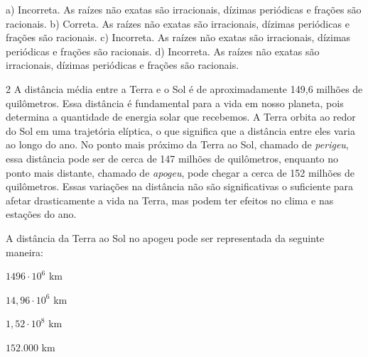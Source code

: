 \begin{escolha}
\begin{escolha}
\begin{escolha}
\begin{escolha}
{\begin{boxmedio}
\begin{boxpeq}
\begin{q°}
\begin{boxmedio}
\begin{boxpeq}
\begin{boxpeq}
\begin{boxmedio}
\begin{boxmedio}
\begin{boxmedio}
\begin{largebox}
\begin{boxmedio}
{\begin{enumerate}
\begin{boxpeq}
{\begin{boxpeq}
\begin{boxpeq}
\begin{boxmedio}
\begin{boxpeq}
\begin{boxpeq}
\begin{boxpeq}
{a) Incorreta. As raízes não exatas são irracionais, dízimas periódicas
e frações são racionais. 
b) Correta. As raízes não exatas são irracionais, dízimas periódicas
e frações são racionais.
c) Incorreta. As raízes não exatas são irracionais, dízimas periódicas
e frações são racionais. 
d) Incorreta. As raízes não exatas são irracionais, dízimas periódicas
e frações são racionais.} 

\num{2} A distância média entre a Terra e o Sol é de aproximadamente 149,6
milhões de quilômetros. Essa distância é fundamental para a vida em
nosso planeta, pois determina a quantidade de energia solar que
recebemos. A Terra orbita ao redor do Sol em uma trajetória elíptica,
o que significa que a distância entre eles varia ao longo do ano. No
ponto mais próximo da Terra ao Sol, chamado de \textit{perigeu}, essa distância
pode ser de cerca de 147 milhões de quilômetros, enquanto no ponto
mais distante, chamado de \textit{apogeu}, pode chegar a cerca de 152 milhões
de quilômetros. Essas variações na distância não são significativas o
suficiente para afetar drasticamente a vida na Terra, mas podem ter
efeitos no clima e nas estações do ano.

A distância da Terra ao Sol no apogeu pode ser representada da seguinte maneira:

\begin{escolha}

  \item $1496 \cdot 10^{6}$ km 

  \item $14,96 \cdot 10^{6}$ km 

  \item $1,52 \cdot 10^{8}$ km 

  \item $152.000$ km

\end{escolha}



\end{boxpeq}
\end{boxpeq}
\end{boxpeq}
\end{boxmedio}
\end{boxpeq}
\end{boxpeq}}
\end{boxpeq}
\end{enumerate}}
\end{boxmedio}
\end{largebox}
\end{boxmedio}
\end{boxmedio}
\end{boxmedio}
\end{boxpeq}
\end{boxpeq}
\end{boxmedio}
\end{q°}
\end{boxpeq}
\end{boxmedio}}
\end{escolha}
\end{escolha}
\end{escolha}
\end{escolha}
